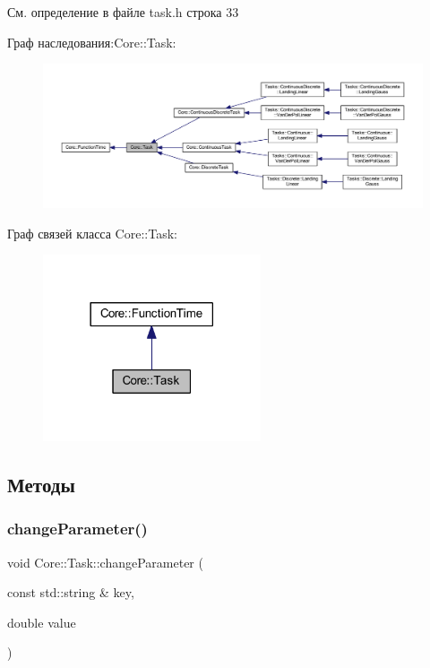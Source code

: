См. определение в файле task.\+h строка 33



Граф наследования\+:Core\+:\+:Task\+:\nopagebreak
\begin{figure}[H]
\begin{center}
\leavevmode
\includegraphics[width=350pt]{class_core_1_1_task__inherit__graph}
\end{center}
\end{figure}


Граф связей класса Core\+:\+:Task\+:\nopagebreak
\begin{figure}[H]
\begin{center}
\leavevmode
\includegraphics[width=182pt]{class_core_1_1_task__coll__graph}
\end{center}
\end{figure}


\subsection{Методы}
\hypertarget{class_core_1_1_task_ac8b451d78816e62347954452b7ace250}{}\label{class_core_1_1_task_ac8b451d78816e62347954452b7ace250} 
\subsubsection{\texorpdfstring{change\+Parameter()}{changeParameter()}}
{\footnotesize\ttfamily void Core\+::\+Task\+::change\+Parameter (\begin{DoxyParamCaption}\item[{const std\+::string \&}]{key,  }\item[{double}]{value }\end{DoxyParamCaption})}



